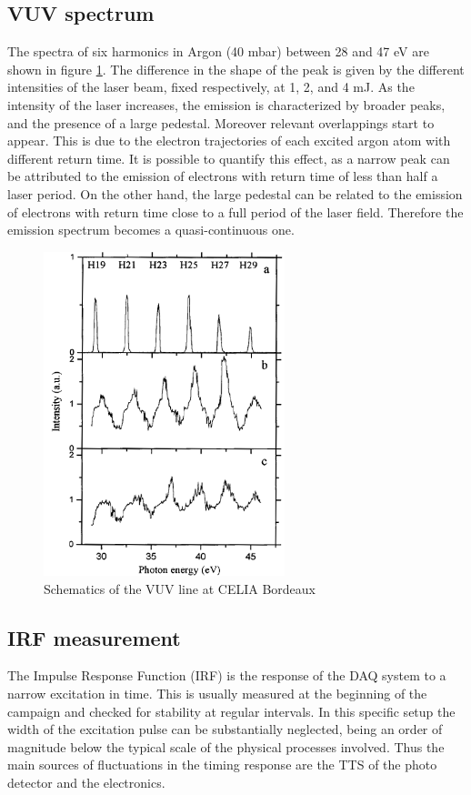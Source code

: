 \subsection{VUV spectrum}
The spectra of six harmonics in Argon (40 mbar) between 28 and 47 eV are shown in figure \ref{fig:VUV_spectrum}.
The difference in the shape of the peak is given by the different intensities of the laser beam, fixed respectively, at 1, 2, and 4 mJ.
As the intensity of the laser increases, the emission is characterized by broader peaks, and the presence of a large pedestal.
Moreover relevant overlappings start to appear.
This is due to the electron trajectories of each excited argon atom with different return time.
It is possible to quantify this effect, as a narrow peak can be attributed to the emission of electrons with return time of less than half a laser period.
On the other hand, the large pedestal can be related to the emission of electrons with return
time close to a full period of the laser field.
Therefore the emission spectrum becomes a quasi-continuous one.

\begin{figure}[htbp]
\begin{center}
\includegraphics[width=7cm]{../Pictures/Chapter_7/VUV_spectrum.png}
\end{center}
\caption[VUV spectrum]{Schematics of the VUV line at CELIA Bordeaux \cite{Martin2001}}
\label{fig:VUV_spectrum}
\end{figure}

\subsection{IRF measurement}
The Impulse Response Function (IRF) is the response of the DAQ system to a narrow excitation in time. This is usually measured at the beginning of the campaign and checked for stability at regular intervals.
In this specific setup the width of the excitation pulse can be substantially neglected, being an order of magnitude below the typical scale of the physical processes involved. Thus the main sources of fluctuations in the timing response are the TTS of the photo detector and the electronics.

